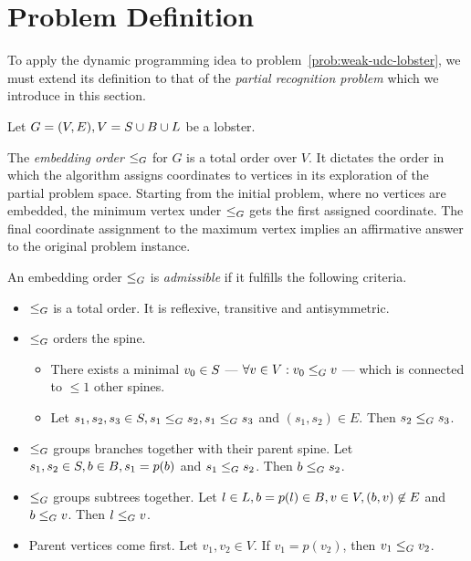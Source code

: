 \section{Problem Definition}
\label{section:ch4-probdef}
To apply the dynamic programming idea to problem~\ref{prob:weak-udc-lobster}, we must extend its definition to that of the \emph{partial recognition problem} which we introduce in this section.

Let $G = (V, E), V = S \cup B \cup L$ be a lobster. 

The \emph{embedding order} $\leq_G$ for $G$ is a total order over $V$. It dictates the order in which the algorithm assigns coordinates to vertices in its exploration of the partial problem space. Starting from the initial problem, where no vertices are embedded, the minimum vertex under $\leq_G$ gets the first assigned coordinate. The final coordinate assignment to the maximum vertex implies an affirmative answer to the original problem instance. 

An embedding order $\leq_G$ is \emph{admissible} if it fulfills the following criteria.

\begin{itemize}
    \item $\leq_G$ is a total order. It is reflexive, transitive and antisymmetric.
    \item $\leq_G$ orders the spine.
    \begin{itemize}
        \item There exists a minimal $v_0 \in S$ --- $\forall v \in V: v_0 \leq_G v$ --- which is connected to $\leq 1$ other spines.
        \item Let $s_1, s_2, s_3 \in S, s_1 \leq_G s_2, s_1 \leq_G s_3$ and $(s_1, s_2) \in E$. Then $s_2 \leq_G s_3$.
    \end{itemize}
    \item $\leq_G$ groups branches together with their parent spine. Let $s_1, s_2 \in S, b \in B, s_1 = p(b)$ and $s_1 \leq_G s_2$. Then $b \leq_G s_2$.
    \item $\leq_G$ groups subtrees together. Let $l \in L, b = p(l) \in B, v \in V, (b, v) \not\in E$ and $b \leq_G v$. Then $l \leq_G v$.
    \item Parent vertices come first. Let $v_1, v_2 \in V$. If $v_1 = p(v_2)$, then $v_1 \leq_G v_2$.
\end{itemize}

